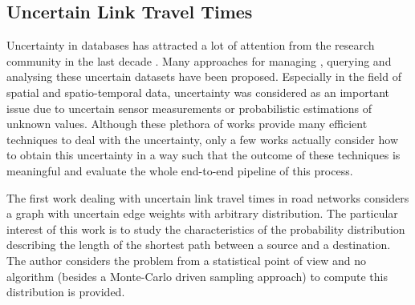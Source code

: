 
\subsection{Uncertain Link Travel Times}
\label{subsec:ult}
Uncertainty in databases has attracted a lot of attention from the research community in the last decade . Many approaches for managing \cite{Agrawal06,Antova08,Jampani08}, querying \cite{Soliman07,Li11} and analysing \cite{Chui07,Chau06} these uncertain datasets have been proposed. Especially in the field of spatial \cite{Cheng04,Dai05} and spatio-temporal \cite{Emrich12,Niedermayer13} data, uncertainty was considered as an important issue due to uncertain sensor measurements or probabilistic estimations of unknown values. Although these plethora of works provide many efficient techniques to deal with the uncertainty, only a few works actually consider how to obtain this uncertainty in a way such that the outcome of these techniques is meaningful and evaluate the whole end-to-end pipeline of this process.


The first work \cite{Frank69} dealing with uncertain link travel times in road networks considers a graph with uncertain edge weights with arbitrary distribution. The particular interest of this work is to study the characteristics of the probability distribution describing the length of the shortest path between a source and a destination. The author considers the problem from a statistical point of view and no algorithm (besides a Monte-Carlo driven sampling approach) to compute this distribution is provided.

